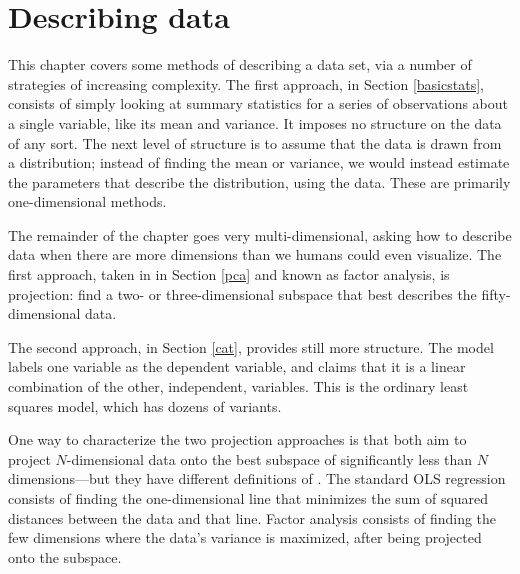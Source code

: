 \chapter{Describing data} \label{projections}
\def\xv{{\bf x} } \def\yv{{\bf y} } \def\pv{{\bf p} }
\def\Iv{{\bf I}}\def\Sv{{\bf S}}\def\yv{{\bf y}}\def\Zv{{\bf Z}} \def\cv{{\bf c}} \def\uv{{\bf u}} \def\Yv{{\bf Y}} \def\Xv{{\bf X}} \def\Qv{{\bf Q}}
\def\betav{{\mbox{\boldmath$\beta$}}}
\def\vector#1{\left[\begin{matrix}#1\end{matrix}\right]}

This chapter covers some methods of describing a data set, via a
number of strategies of increasing complexity. 
The first approach, in Section \ref{basicstats}, consists of simply looking
at summary statistics for a series of observations about a single
variable, like its mean and variance. It imposes no structure on the
data of any sort. The next level of structure is to
assume that the data is drawn from a distribution; instead of finding
the mean or variance, we would instead estimate the parameters that
describe the distribution, using the data. These are primarily
one-dimensional methods.

The remainder of the chapter goes very multi-dimensional, asking how
to describe data when there are more dimensions than we humans could
even visualize. The first approach, taken in in Section \ref{pca} and
known as factor analysis,
is projection: find a two- or three-dimensional subspace that best
describes the fifty-dimensional data. 

The second approach, in Section \ref{cat}, provides still more
structure. The model labels one variable as the dependent variable, and claims
that it is a linear combination of the other, independent, variables.
This is the ordinary least squares model, which has dozens of variants.

One way to characterize the two projection approaches is that both
aim to project $N$-di\-men\-sion\-al data onto the best subspace of
significantly less than $N$ di\-men\-sions---but they have different
definitions of .  The standard OLS regression consists of
finding the one-dimensional line that minimizes the sum of squared
distances between the data and that line. Factor analysis consists
of finding the few dimensions where the data's variance is maximized,
after being projected onto the subspace.



